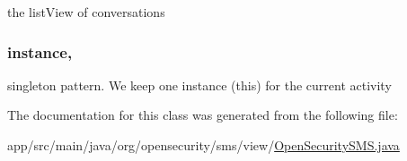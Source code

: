 the list\+View of conversations \hypertarget{a00011_abb0d0e377de688c5417fcaf531612a23}{
\subsubsection[{instance}]{ instance\hspace{0.3cm}{\ttfamily [static]}, {\ttfamily [private]}}}\label{a00011_abb0d0e377de688c5417fcaf531612a23}
singleton pattern. We keep one instance (this) for the current activity 

The documentation for this class was generated from the following file\+:\begin{DoxyCompactItemize}
\item 
app/src/main/java/org/opensecurity/sms/view/\hyperlink{a00031}{Open\+Security\+S\+M\+S.\+java}\end{DoxyCompactItemize}

